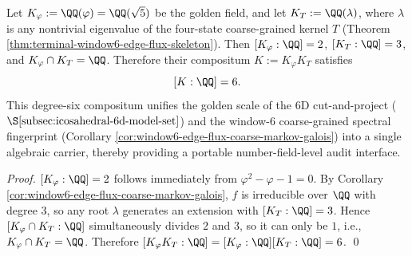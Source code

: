 \begin{corollary}\label{cor:window6-golden-cubic-audit-field-degree6}
Let \(K_\varphi:=\QQ(\varphi)=\QQ(\sqrt5)\) be the golden field, and let \(K_T:=\QQ(\lambda)\), where \(\lambda\) is any nontrivial eigenvalue of the four-state coarse-grained kernel \(T\) (Theorem \ref{thm:terminal-window6-edge-flux-skeleton}).
Then \([K_\varphi:\QQ]=2\), \([K_T:\QQ]=3\), and \(K_\varphi\cap K_T=\QQ\).
Therefore their compositum \(K:=K_\varphi K_T\) satisfies
\[
[K:\QQ]=6.
\]
This degree-six compositum unifies the golden scale of the 6D cut-and-project (\(\S\ref{subsec:icosahedral-6d-model-set}\)) and the window-\(6\) coarse-grained spectral fingerprint (Corollary \ref{cor:window6-edge-flux-coarse-markov-galois}) into a single algebraic carrier, thereby providing a portable number-field-level audit interface.
\end{corollary}
\begin{proof}
\([K_\varphi:\QQ]=2\) follows immediately from \(\varphi^2-\varphi-1=0\).
By Corollary \ref{cor:window6-edge-flux-coarse-markov-galois}, \(f\) is irreducible over \(\QQ\) with degree \(3\), so any root \(\lambda\) generates an extension with \([K_T:\QQ]=3\).
Hence \([K_\varphi\cap K_T:\QQ]\) simultaneously divides \(2\) and \(3\), so it can only be \(1\), i.e., \(K_\varphi\cap K_T=\QQ\).
Therefore
\(
[K_\varphi K_T:\QQ]=[K_\varphi:\QQ][K_T:\QQ]=6
\).
\qed
\end{proof}

